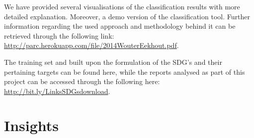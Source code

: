 \documentclass[]{article}
\begin{document}
We have provided several visualisations of the classification results with more detailed explanation. Moreover, a demo version of the classification tool. Further information regarding the used approach and methodology behind it can be retrieved through the following link: \url{http://parc.herokuapp.com/file/2014WouterEekhout.pdf}.

The training set and built upon the formulation of the SDG's and their pertaining targets can be found here, while the reports analysed as part of this project can be accessed through the following here: \url{http://bit.ly/LinksSDGsdownload}.

\section{Insights}
\end{document}
